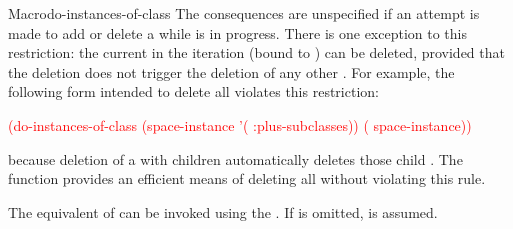 \documentclass[10pt,twoside,english,pdftex]{article}
\begin{document}
\begin{functiondoc}{Macro}{do-instances-of-class}
\fnnote {}%
%
%
The consequences are unspecified if an attempt is made to add or delete a
 while  is in
progress.  There is one exception to this restriction: the current
 in the iteration (bound to ) can be deleted,
provided that the deletion does not trigger the deletion of any other
.  For example, the following form intended to delete
all  violates this restriction:
%
\W\supp
\begin{example}
   \textcolor{red}{(do-instances-of-class (space-instance 
                             '( :plus-subclasses))
     ( space-instance))}
\end{example}
%
because deletion of a  with children automatically
deletes those child .  The function
 provides an efficient
means of deleting all  without violating this rule.

\replnote 
%
%
%
The equivalent of  can be invoked using the 
.  If  is
omitted,  is assumed.

\end{functiondoc}

\end{document}
